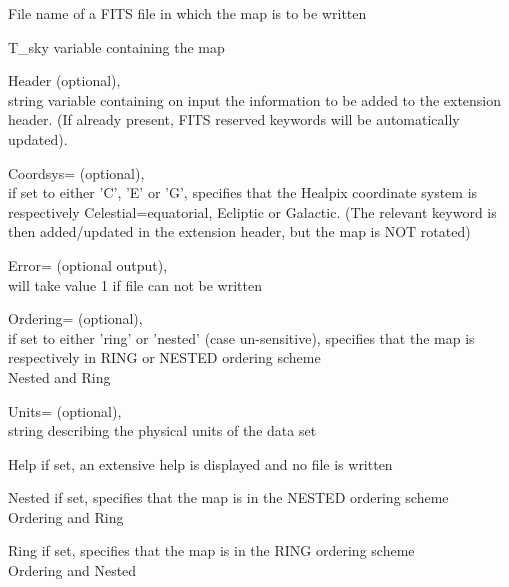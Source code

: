 \begin{qualifiers}
  \begin{qulist}{} %
 	\item[{File}] 
          name of a FITS file in which the map is to be written

 	\item[{T\_sky}] 
	variable containing the \healpix map

       \item[{Header}]
		  (optional), \\
		string variable containing on input  the information to be added
		  to the extension header. (If already present, FITS reserved
		  keywords will be automatically updated).

       \item[{Coordsys=}]
		  (optional), \\
		if set to either 'C', 'E' or 'G',  specifies that the
		Healpix coordinate system is respectively Celestial=equatorial,
		  Ecliptic or Galactic.
		(The relevant keyword is then added/updated in the extension
		  header, but the map is NOT rotated)

	\item[{Error=}]
		(optional output), \\
		will take value 1 if file can not be written

	\item[{Ordering=}]
		  (optional), \\
		if set to either 'ring' or 'nested' (case un-sensitive),
		  specifies that the map is respectively in RING or NESTED
		  ordering scheme\\
		\seealso Nested and Ring

	\item[{Units=}]
		(optional), \\
		string describing the physical units of the data set
  \end{qulist}
\end{qualifiers}

\begin{keywords}
  \begin{kwlist}{} %
	\item[{Help}] if set, an extensive help is displayed and no
	file is written
	\item[{Nested}] if set, specifies that the map is in the NESTED ordering
	scheme\\
	\seealso Ordering and Ring 
	\item[{Ring}] if set, specifies that the map is in the RING ordering
	scheme\\
	\seealso Ordering and Nested
   \end{kwlist}
\end{keywords}

